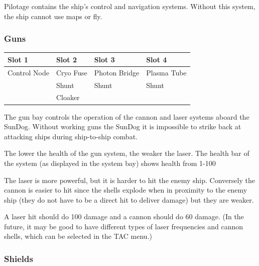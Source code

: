 \begin{itemize}
Pilotage contains the ship's control and navigation systems. Without this system, the ship cannot use maps or fly.

\subsubsection{Guns}

\begin{tabular}{ | p{2.5cm} | p{2.5cm} | p{2.5cm} | p{2.5cm} | }
\hline
Slot 1 & Slot 2 & Slot 3 & Slot 4 \\ \hline
Control Node & Cryo Fuse & Photon Bridge & Plasma Tube \\
& Shunt & Shunt & Shunt \\
& Cloaker & & \\
\hline
\end{tabular}

The gun bay controls the operation of the cannon and laser systems aboard
the SunDog.  Without working guns the SunDog it is impossible to strike
back at attacking ships during ship-to-ship combat.

The lower the health of the gun system, the weaker the laser. The health bar of the system (as displayed in the system bay) shows health from 1-100%

The laser is more powerful, but it is harder to hit the enemy ship. Conversely the cannon is easier to hit since the shells explode when in proximity to the enemy ship (they do not have to be a direct hit to deliver damage) but they are weaker. 

A laser hit should do 100 damage and a cannon should do 60 damage. (In the future, it may be good to have different types of laser frequencies and cannon shells, which can be selected in the TAC menu.) 



\subsubsection{Shields}


\end{itemize}
